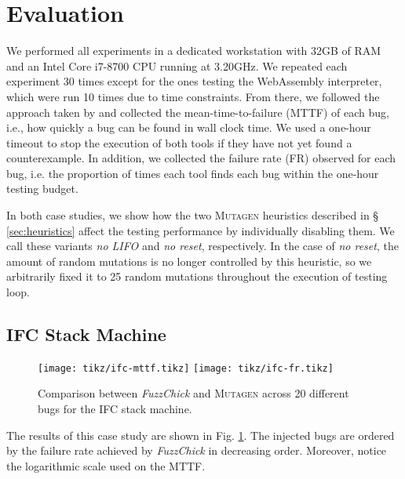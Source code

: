 \documentclass[sigconf,review,anonymous]{acmart}
\newcommand{\fuzzchick}{\textit{FuzzChick}\xspace}
\newcommand{\mutagen}{\textsc{Mutagen}\xspace}
\begin{document}

\section{Evaluation}
\label{sec:evaluation}

We performed all experiments in a dedicated workstation with 32GB of RAM and an
Intel Core i7-8700 CPU running at 3.20GHz.
%
We repeated each experiment 30 times except for the ones testing the WebAssembly
interpreter, which were run 10 times due to time constraints.
%
From there, we followed the approach taken by
\citeauthor{lampropoulos2019coverage} and collected the mean-time-to-failure
(MTTF) of each bug, i.e., how quickly a bug can be found in wall clock time.
%
We used a one-hour timeout to stop the execution of both tools if they have not
yet found a counterexample.
%
In addition, we collected the failure rate (FR) observed for each bug, i.e. the
proportion of times each tool finds each bug within the one-hour testing budget.
%

In both case studies, we show how the two \mutagen heuristics described in \S
\ref{sec:heuristics} affect the testing performance by individually disabling
them.
%
We call these variants \textit{no LIFO} and \textit{no reset}, respectively.
%
In the case of \textit{no reset}, the amount of random mutations is no longer
controlled by this heuristic, so we arbitrarily fixed it to 25 random mutations
throughout the execution of testing loop.

\subsection{IFC Stack Machine}

\begin{figure}[b]
  \centering
  \texttt{[image: tikz/ifc-mttf.tikz]}
  \texttt{[image: tikz/ifc-fr.tikz]}
  \vspace{-20pt}
  \caption{\label{fig:results:ifc} Comparison between \fuzzchick and \mutagen
    across 20 different bugs for the IFC stack machine. }
\vspace{-5pt}
\end{figure}


The results of this case study are shown in Fig. \ref{fig:results:ifc}.
%
%
The injected bugs are ordered by the failure rate achieved by \fuzzchick in
decreasing order.
%
Moreover, notice the logarithmic scale used on the MTTF.
\end{document}
